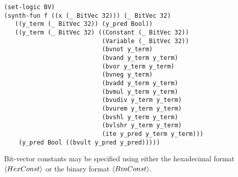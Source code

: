 \documentclass[english,a4paper,10pt]{article}
\begin{document}
\begin{appendix}
\begin{comment}
\begin{lstlisting}[basicstyle={\ttfamily}]
(set-logic BV)
(synth-fun f ((x (_ BitVec 32))) (_ BitVec 32)
   ((y_term (_ BitVec 32)) (y_pred Bool))
   ((y_term (_ BitVec 32) ((Constant (_ BitVec 32))
                           (Variable (_ BitVec 32))
                           (bvnot y_term)
                           (bvand y_term y_term)
                           (bvor y_term y_term)
                           (bvneg y_term)
                           (bvadd y_term y_term)
                           (bvmul y_term y_term)
                           (bvudiv y_term y_term)
                           (bvurem y_term y_term)
                           (bvshl y_term y_term)
                           (bvlshr y_term y_term)
                           (bvnand y_term y_term)
                           (bvnor y_term y_term)
                           (bvxor y_term y_term)
                           (bvxnor y_term y_term)
                           (bvsub y_term y_term)
                           (bvsdiv y_term y_term)
                           (bvsrem y_term y_term)
                           (bvsmod y_term y_term)
                           (bvashr y_term y_term)
                           (ite y_pred y_term y_term)))
    (y_pred Bool (...
                  (bvult y_pred y_pred)
                  (bvule y_pred y_pred)
                  (bvugt y_pred y_pred)
                  (bvuge y_pred y_pred)
                  (bvslt y_pred y_pred)
                  (bvsle y_pred y_pred)
                  (bvsgt y_pred y_pred)
                  (bvsge y_pred y_pred))))))
\end{lstlisting}
\end{comment}
\begin{lstlisting}[basicstyle={\ttfamily}]
(set-logic BV)
(synth-fun f ((x (_ BitVec 32))) (_ BitVec 32)
   ((y_term (_ BitVec 32)) (y_pred Bool))
   ((y_term (_ BitVec 32) ((Constant (_ BitVec 32))
                           (Variable (_ BitVec 32))
                           (bvnot y_term)
                           (bvand y_term y_term)
                           (bvor y_term y_term)
                           (bvneg y_term)
                           (bvadd y_term y_term)
                           (bvmul y_term y_term)
                           (bvudiv y_term y_term)
                           (bvurem y_term y_term)
                           (bvshl y_term y_term)
                           (bvlshr y_term y_term)
                           (ite y_pred y_term y_term)))
    (y_pred Bool ((bvult y_pred y_pred)))))
\end{lstlisting}
Bit-vector constants may be specified
using either the hexadecimal format $\left\langle HexConst\right\rangle$
or the binary format $\left\langle BinConst\right\rangle$.



\end{appendix}
\end{document}
